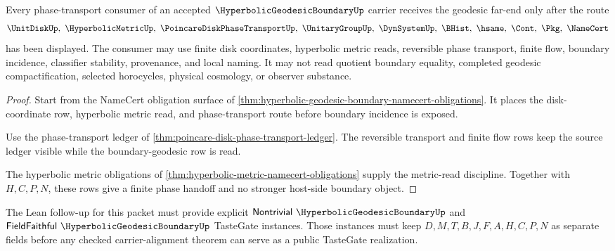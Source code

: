 \begin{theorem}
\label{thm:hyperbolic-geodesic-boundary-phase-handoff}
Every phase-transport consumer of an accepted $\HyperbolicGeodesicBoundaryUp$ carrier receives the geodesic far-end only after the route
$$
\UnitDiskUp,\ \HyperbolicMetricUp,\ \PoincareDiskPhaseTransportUp,\ \UnitaryGroupUp,\ \DynSystemUp,\ \BHist,\ \hsame,\ \Cont,\ \Pkg,\ \NameCert
$$
has been displayed. The consumer may use finite disk coordinates, hyperbolic metric reads, reversible phase transport, finite flow, boundary incidence, classifier stability, provenance, and local naming. It may not read quotient boundary equality, completed geodesic compactification, selected horocycles, physical cosmology, or observer substance.
\end{theorem}
\begin{proof}
Start from the NameCert obligation surface of \autoref{thm:hyperbolic-geodesic-boundary-namecert-obligations}. It places the disk-coordinate row, hyperbolic metric read, and phase-transport route before boundary incidence is exposed.

Use the phase-transport ledger of \autoref{thm:poincare-disk-phase-transport-ledger}. The reversible transport and finite flow rows keep the source ledger visible while the boundary-geodesic row is read.

The hyperbolic metric obligations of \autoref{thm:hyperbolic-metric-namecert-obligations} supply the metric-read discipline. Together with $H,C,P,N$, these rows give a finite phase handoff and no stronger host-side boundary object.
\end{proof}



The Lean follow-up for this packet must provide explicit $\mathsf{Nontrivial}\ \HyperbolicGeodesicBoundaryUp$ and $\mathsf{FieldFaithful}\ \HyperbolicGeodesicBoundaryUp$ TasteGate instances. Those instances must keep $D,M,T,B,J,F,A,H,C,P,N$ as separate fields before any checked carrier-alignment theorem can serve as a public TasteGate realization.

